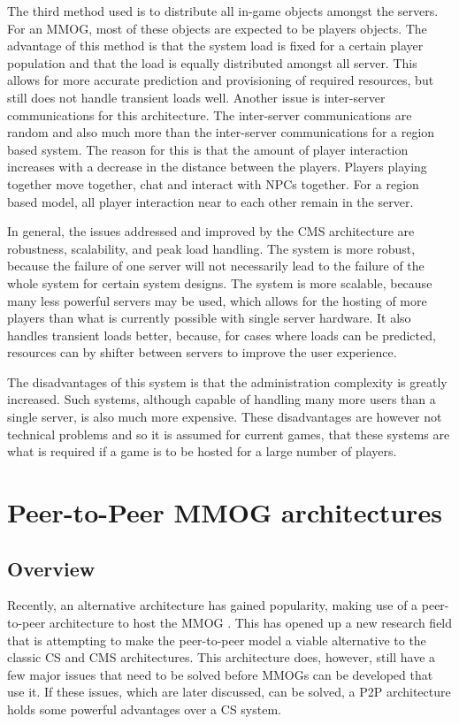 \documentclass[journal,oneside,a4paper,onecolumn]{IEEEtran}
\begin{document}
The third method used is to distribute all in-game objects amongst the servers. For an MMOG, most of these objects are expected to be players objects. The advantage of this method is that the system load is fixed for a certain player population and that the load is equally distributed amongst all server. This allows for more accurate prediction and provisioning  of required resources, but still does not handle transient loads well. Another issue is inter-server communications for this architecture. The inter-server communications are random and also much more than the inter-server communications for a region based system. The reason for this is that the amount of player interaction increases with a decrease in the distance between the players. Players playing together move together, chat and interact with \acp{NPC} together. For a region based model, all player interaction near to each other remain in the server.

In general, the issues addressed and improved by the \ac{CMS} architecture are robustness, scalability, and peak load handling. The system is more robust, because the failure of one server will not necessarily lead to the failure of the whole system for certain system designs. The system is more scalable, because many less powerful servers may be used, which allows for the hosting of more players than what is currently possible with single server hardware. It also handles transient loads better, because, for cases where loads can be predicted, resources can by shifter between servers to improve the user experience.

The disadvantages of this system is that the administration complexity is greatly increased. Such systems, although capable of handling many more users than a single server, is also much more expensive. These disadvantages are however not technical problems and so it is assumed for current games, that these systems are what is required if a game is to be hosted for a large number of players.

\section{Peer-to-Peer MMOG architectures}
\subsection{Overview}

Recently, an alternative architecture has gained popularity, making use of a peer-to-peer architecture to host the MMOG \cite{}. This has opened up a new research field that is attempting to make the peer-to-peer model a viable alternative to the classic \ac{CS} and \ac{CMS} architectures. This architecture does, however, still have a few major issues that need to be solved before MMOGs can be developed that use it. If these issues, which are later discussed, can be solved, a \ac{P2P} architecture holds some powerful advantages over a \ac{CS} system.
\end{document}
